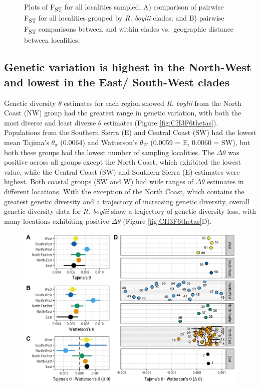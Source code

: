\documentclass[proquest,12pt,final]{ucthesis-CA2012} %
\begin{document}
\begin{ucmainmatter}
\begin{figure}
{}

\caption{Plots of F\textsubscript{ST} for all localities sampled,
A) comparison of pairwise F\textsubscript{ST} for all localities grouped
by \emph{R. boylii} clades; and B) pairwise F\textsubscript{ST}
comparisons between and within clades vs.~geographic distance between
localities.}\label{fig:CH3F5fst}
\end{figure}
\clearpage

\hypertarget{genetic-variation-is-highest-in-the-north-west-and-lowest-in-the-east-south-west-clades}{%
\subsection{Genetic variation is highest in the North-West and lowest in
the East/ South-West
clades}\label{genetic-variation-is-highest-in-the-north-west-and-lowest-in-the-east-south-west-clades}}

Genetic diversity \(\theta\) estimates for each region showed \emph{R.
boylii} from the North Coast (NW) group had the greatest range in
genetic variation, with both the most diverse and least diverse
\(\theta\) estimates (Figure \ref{fig:CH3F6thetas}). Populations from
the Southern Sierra (E) and Central Coast (SW) had the lowest mean
Tajima's \(\theta_\pi\) (0.0064) and Watterson's \(\theta_W\) (0.0059 =
E, 0.0060 = SW), but both these groups had the lowest number of sampling
localities. The \(\Delta \theta\) was positive across all groups except
the North Coast, which exhibited the lowest value, while the Central
Coast (SW) and Southern Sierra (E) estimates were highest. Both coastal
groups (SW and W) had wide ranges of \(\Delta \theta\) estimates in
different locations. With the exception of the North Coast, which
contains the greatest genetic diversity and a trajectory of increasing
genetic diversity, overall genetic diversity data for \emph{R. boylii}
show a trajectory of genetic diversity loss, with many locations
exhibiting positive \(\Delta \theta\) (Figure \ref{fig:CH3F6thetas}D).








\begin{figure}

{\centering \includegraphics[width=0.95\linewidth]{figure/ch3/fig_06_thetas_taj_watt_tdiff_95CI_fig06} 

}
\end{figure}
\end{ucmainmatter}
\end{document}
